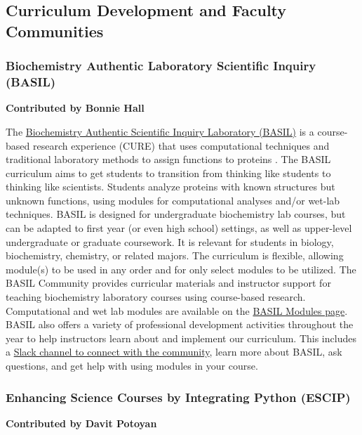 \documentclass[9pt,review]{livecoms}
\begin{document}
\subsection{Curriculum Development and Faculty Communities}

\subsubsection{Biochemistry Authentic Laboratory Scientific Inquiry (BASIL)}

\textbf{Contributed by Bonnie Hall}

The \href{(https://www.basilbiochem.org/home)}{Biochemistry Authentic Scientific Inquiry Laboratory (BASIL)} is a course-based research experience (CURE) that uses computational techniques and traditional laboratory methods to assign functions to proteins \cite{Roberts2019}. 
The BASIL curriculum aims to get students to transition from thinking like students to thinking like scientists. 
Students analyze proteins with known structures but unknown functions, using modules for computational analyses and/or wet-lab techniques. 
BASIL is designed for undergraduate biochemistry lab courses, but can be adapted to first year (or even high school) settings, as well as upper-level undergraduate or graduate coursework. It is relevant for students in biology, biochemistry, chemistry, or related majors. The curriculum is flexible, allowing module(s) to be used in any order and for only select modules to be utilized.
The BASIL Community provides curricular materials and instructor support for teaching biochemistry laboratory courses using course-based research. Computational and wet lab modules are available on the \href{https://www.basilbiochem.org/basil-modules}{BASIL Modules page}. 
BASIL also offers a variety of professional development activities throughout the year to help instructors learn about and implement our curriculum. This includes a \href{https://join.slack.com/t/onlinebasildiscussion/shared_invite/zt-1skdrd7br-x9MWjHCcNjmV0gkNftNMaw}{Slack channel to connect with the community}, learn more about BASIL, ask questions, and get help with using modules in your course.

\subsubsection{Enhancing Science Courses by Integrating Python (ESCIP)}

\textbf{Contributed by Davit Potoyan}
\end{document}
